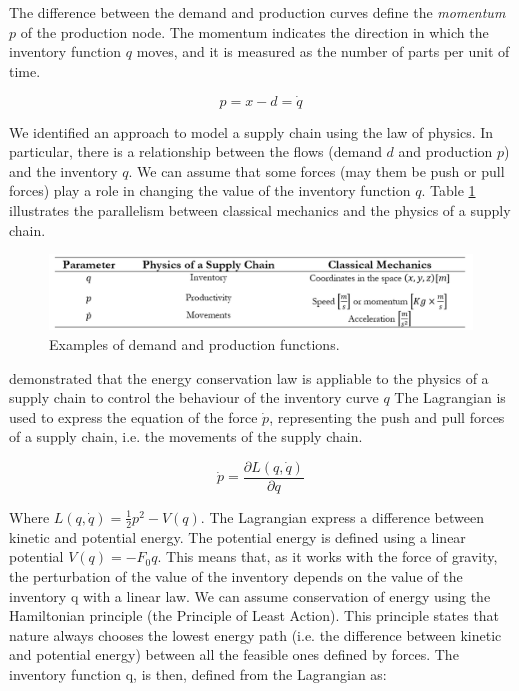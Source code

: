 The difference between the demand and production curves define the \textit{momentum} $p$ of the production node. The momentum indicates the direction in which the inventory function $q$ moves, and it is measured as the number of parts per unit of time.

\begin{equation}
p=x-d=\dot{q}
\label{eq_physics2}
\end{equation}

We identified an approach to model a supply chain using the law of physics. In particular, there is a relationship between the flows (demand $d$ and production $p$) and the inventory $q$. We can assume that some forces (may them be push or pull forces) play a role in changing the value of the inventory function $q$. Table \ref{tab_classicalMechanics} illustrates the parallelism between classical mechanics and the physics of a supply chain.

\begin{figure}[hbt!]
\centering
\includegraphics[width=1\textwidth]{SectionIntroduction/informationFramework_figures/tab_classicalMechanics.png}
\captionsetup{type=figure}
\caption{Examples of demand and production functions.}
\label{tab_classicalMechanics}
\end{figure}

\cite{Spearman2014} demonstrated that the energy conservation law is appliable to the physics of a supply chain to control the behaviour of the inventory curve $q$ The Lagrangian is used to express the equation of the force $\dot{p}$, representing the push and pull forces of a supply chain, i.e. the movements of the supply chain.

\begin{equation}
\dot{p}=\frac{\partial L(q,\dot{q})}{\partial q}
\label{eq_physics3}
\end{equation}

Where $L\left(q,\dot{q}\right)=\frac{1}{2}p^2-V(q)$. The Lagrangian express a difference between kinetic and potential energy. The potential energy is defined using a linear potential $V\left(q\right)=-F_0q$. This means that, as it works with the force of gravity, the perturbation of the value of the inventory depends on the value of the inventory q with a linear law. We can assume conservation of energy using the Hamiltonian principle (the Principle of Least Action). This principle states that nature always chooses the lowest energy path (i.e. the difference between kinetic and potential energy) between all the feasible ones defined by forces. The inventory function q, is then, defined from the Lagrangian as:

